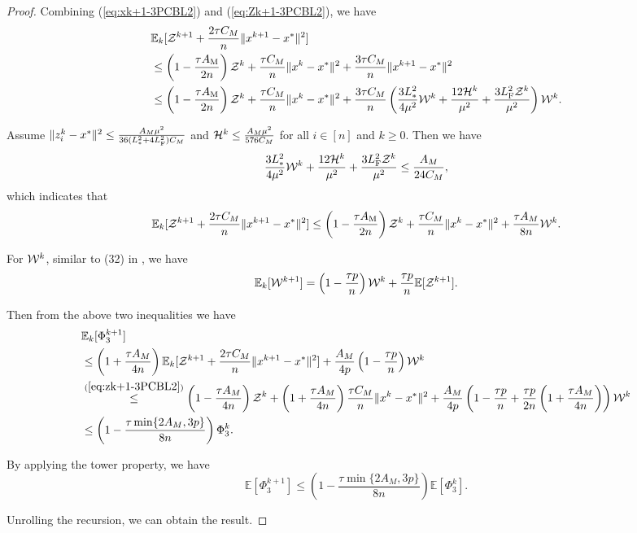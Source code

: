 \documentclass[11pt]{article}
\begin{document}
\begin{proof}
		Combining (\ref{eq:xk+1-3PCBL2}) and (\ref{eq:Zk+1-3PCBL2}), we have 
		\begin{align*}
			&\mathbb{E}_k [{\cal Z}^{k+1} + \frac{2\tau C_M}{n} \|x^{k+1} - x^*\|^2] \\
			& \leq \left(  1 - \frac{\tau A_{\rm M}}{2n}  \right) {\cal Z}^k +  \frac{\tau C_M}{n} \|x^k-x^*\|^2 +  \frac{3\tau C_M}{n} \|x^{k+1} - x^*\|^2 \\ 
			& \leq \left(  1 - \frac{\tau A_{\rm M}}{2n}  \right) {\cal Z}^k +  \frac{\tau C_M}{n} \|x^k-x^*\|^2 +  \frac{3\tau C_M}{n} \left(  \frac{3L_{*}^2}{4\mu^2} {\cal W}^k + \frac{12{\cal H}^k}{\mu^2} + \frac{3L_{\rm F}^2{\cal Z}^k}{\mu^2}  \right) {\cal W}^k. 
		\end{align*}
		
		Assume $\|z_i^k-x^*\|^2 \leq \frac{A_M \mu^2}{36(L_{*}^2 + 4L_{\rm F}^2)C_M}$ and ${\cal H}^k \leq \frac{A_M\mu^2}{576C_M}$ for all $i\in [n]$ and $k\geq 0$. Then we have 
		$$
		\frac{3L_{*}^2}{4\mu^2} {\cal W}^k + \frac{12{\cal H}^k}{\mu^2} + \frac{3L_{\rm F}^2{\cal Z}^k}{\mu^2}  \leq \frac{A_M}{24C_M}, 
		$$
		which indicates that 
		\begin{equation}\label{eq:zk+1-3PCBL2}
			\mathbb{E}_k [{\cal Z}^{k+1} + \frac{2\tau C_M}{n} \|x^{k+1} - x^*\|^2] \leq \left(  1 - \frac{\tau A_{\rm M}}{2n}  \right) {\cal Z}^k +  \frac{\tau C_M}{n} \|x^k-x^*\|^2 + \frac{\tau A_M}{8n} {\cal W}^k. 
		\end{equation}
		
		
		For ${\cal W}^k$, similar to (32) in \citep{qian2021basis}, we have 
		$$
		\mathbb{E}_k [{\cal W}^{k+1}] = \left(  1 - \frac{\tau p}{n}  \right) {\cal W}^k + \frac{\tau p}{n} \mathbb{E} [{\cal Z}^{k+1}]. 
		$$
		
		Then from the above two inequalities we have 
		\begin{align*}
			&\mathbb{E}_k[\Phi_3^{k+1}] \\
			& \leq \left(  1 + \frac{\tau A_M}{4n}  \right) \mathbb{E}_k [{\cal Z}^{k+1} + \frac{2\tau C_M}{n}\|x^{k+1}-x^*\|^2] + \frac{A_M}{4p} \left(  1 - \frac{\tau p}{n}  \right) {\cal W}^k \\ 
			& \overset{(\ref{eq:zk+1-3PCBL2})}{\leq} \left(  1 - \frac{\tau A_M}{4n}  \right) {\cal  Z}^k + \left(  1 + \frac{\tau A_M}{4n}  \right) \frac{\tau C_M}{n} \|x^k-x^*\|^2 + \frac{A_M}{4p} \left(  1 - \frac{\tau p}{n} + \frac{\tau p}{2n} \left(  1 + \frac{\tau A_M}{4n}  \right)  \right) {\cal W}^k \\ 
			& \leq \left(  1 - \frac{\tau \min\{  2A_M, 3p  \} }{8n}  \right) \Phi_3^k. 
		\end{align*}
		
		By applying the tower property, we have 
		$$
		\mathbb{E}[\Phi_3^{k+1}] \leq \left(  1 - \frac{\tau \min\{  2A_M, 3p  \} }{8n}  \right) \mathbb{E}[\Phi_3^k]. 
		$$
		
		Unrolling the recursion, we can obtain the result. 
		
	\end{proof}
	
\end{document}
